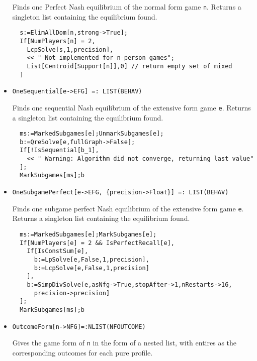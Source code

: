 \begin{itemize}
\bd 
Finds one Perfect Nash equilibrium of the normal form game
\verb+n+.  Returns a singleton list containing the equilibrium found.

\begin{verbatim}
  s:=ElimAllDom[n,strong->True];
  If[NumPlayers[n] = 2, 
    LcpSolve[s,1,precision],
    << " Not implemented for n-person games";
    List[Centroid[Support[n]],0] // return empty set of mixed
  ]
\end{verbatim} 
\ed

\item{}
\protect \large \begin{verbatim}
OneSequential[e->EFG] =: LIST(BEHAV) 
\end{verbatim}\normalsize

\bd 
Finds one sequential Nash equilibrium of the extensive form game
\verb+e+.  Returns a singleton list containing the equilibrium found.

\begin{verbatim}
  ms:=MarkedSubgames[e];UnmarkSubgames[e];
  b:=QreSolve[e,fullGraph->False];
  If[!IsSequential[b_1],
    << " Warning: Algorithm did not converge, returning last value"
  ];
  MarkSubgames[ms];b
\end{verbatim} 
\ed

\item{}
\protect \large \begin{verbatim}
OneSubgamePerfect[e->EFG, {precision->Float}] =: LIST(BEHAV) 
\end{verbatim}\normalsize

\bd 
Finds one subgame perfect Nash equilibrium of the extensive form
game \verb+e+.  Returns a singleton list containing the equilibrium
found.

\begin{verbatim}
  ms:=MarkedSubgames[e];MarkSubgames[e];
  If[NumPlayers[e] = 2 && IsPerfectRecall[e],
    If[IsConstSum[e],
      b:=LpSolve[e,False,1,precision],
      b:=LcpSolve[e,False,1,precision]
    ],
    b:=SimpDivSolve[e,asNfg->True,stopAfter->1,nRestarts->16,
      precision->precision]
  ];
  MarkSubgames[ms];b
\end{verbatim} 
\ed

\item{}
\protect \large \begin{verbatim}
OutcomeForm[n->NFG]=:NLIST(NFOUTCOME)
\end{verbatim}\normalsize

\bd 
Gives the game form of \verb+n+ in the form of a nested list, with
entires as the corresponding outcomes for each pure profile. 


\end{itemize}
